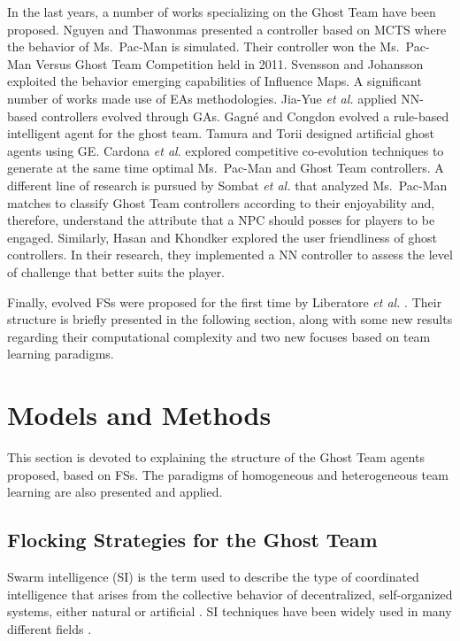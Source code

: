 \documentclass[journal]{IEEEtran}
\begin{document}
In the last years, a number of works specializing on the Ghost Team have been proposed. Nguyen and Thawonmas \cite{Nguyen2011,Nguyen2013} presented a controller based on MCTS where the behavior of Ms.\  Pac-Man is simulated. Their controller won the Ms.\  Pac-Man Versus Ghost Team Competition held in 2011. Svensson and Johansson \cite{Svensson2012} exploited the behavior emerging capabilities of Influence Maps. A significant number of works made use of EAs methodologies. Jia-Yue \emph{et al.} \cite{Jia-Yue11} applied NN-based controllers evolved through GAs. Gagné and Congdon \cite{Gagne2012} evolved a rule-based intelligent agent for the ghost team. Tamura and Torii \cite{Tamura2013} designed artificial ghost agents using GE. Cardona \textit{et al.} \cite{Cardona13} explored competitive co-evolution techniques to generate at the same time optimal Ms.\  Pac-Man and Ghost Team controllers. A different line of research is pursued by Sombat \textit{et al.} \cite{Sombat2012} that analyzed Ms.\  Pac-Man matches to classify Ghost Team controllers according to their enjoyability and, therefore, understand the attribute that a NPC should posses for players to be engaged. Similarly, Hasan and Khondker \cite{Hasan2013} explored the user friendliness of ghost controllers. In their research, they implemented a NN controller to assess the level of challenge that better suits the player.

Finally, evolved FSs were proposed for the first time by Liberatore \emph{et al.} \cite{Liberatore2014}.  Their structure is briefly presented in the following section, along with some new results regarding their computational complexity and two new focuses based on team learning paradigms.

\section{Models and Methods}
\label{sec:ModelsMethods}
This section is devoted to explaining the structure of the Ghost Team agents proposed, based on FSs. The paradigms of homogeneous and heterogeneous team learning are also presented and applied. 

\subsection{Flocking Strategies for the Ghost Team}
Swarm intelligence (SI) is the term used to describe the type of coordinated intelligence that arises from the collective behavior of decentralized, self-organized systems, either natural or artificial \cite{BeniWang89}. SI techniques have been widely used in many different fields \cite{Blum2008}.
\end{document}
